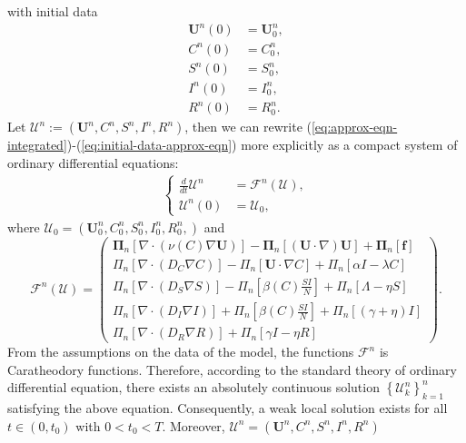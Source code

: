 \documentclass[10pt,number,preprint,times]{elsarticle}
\numberwithin{equation}{section} %
\begin{document}
	with initial data
	\begin{equation}\label{eq:initial-data-approx-eqn}
		\begin{split}
			\boldsymbol{U}^n(0)	&= \boldsymbol{U}_{0}^n,\\
			C^n(0) &= C_{0}^n,\\
			S^n(0) &=S_0^n,\\
			I^n(0) &= I_{0}^n,\\
			R^n(0) &= R_{0}^n.
		\end{split}
	\end{equation}
	Let $\mathcal{U}^n:=(\boldsymbol{U}^n,C^n,S^n,I^n,R^n)$, then we can rewrite (\ref{eq:approx-eqn-integrated})-(\ref{eq:initial-data-approx-eqn}) more explicitly as a compact system of ordinary differential equations:
	\begin{equation}\label{Cauchy-problem}
		\begin{split}
			\begin{cases}
				\frac{d}{dt}\mathcal{U}^n&=\mathcal{F}^n(\mathcal{U}),\\
				\mathcal{U}^n(0)&=\mathcal{U}_0,
			\end{cases}
		\end{split}
	\end{equation}
	where  $\mathcal{U}_0=(\boldsymbol{U}_{0}^n,C_{0}^n,S_{0}^n,I_{0}^n,R_{0}^n,)$ and 
	$$\mathcal{F}^n(\mathcal{U})
	=\begin{pmatrix}
		\boldsymbol{\Pi}_n \left[\nabla \cdot \left(\nu(C) \nabla \boldsymbol{U} \right) \right]-\boldsymbol{\Pi}_n \left[(\boldsymbol{U}\cdot\nabla)\boldsymbol{U} \right]+ 	\boldsymbol{\Pi}_n\left[\boldsymbol{f}\right]
		\\
		\Pi_n \left[\nabla \cdot \left(D_C \nabla C \right) \right]-\Pi_n \left[\boldsymbol{U}\cdot\nabla C \right]+	\Pi_n\left[\alpha I-\lambda C\right]
		\\
		\Pi_n \left[\nabla \cdot \left(D_S \nabla S \right) \right]-\Pi_n \left[ \beta(C)\frac{SI}{N} \right]+	\Pi_n\left[\Lambda -\eta S\right]
		\\
		\Pi_n \left[\nabla \cdot \left(D_I \nabla I \right) \right]+\Pi_n \left[ \beta(C)\frac{SI}{N} \right]+	\Pi_n\left[(\gamma +\eta) I\right]
		\\
		\Pi_n \left[\nabla \cdot \left(D_R \nabla R \right) \right]+	\Pi_n\left[\gamma I-\eta R\right]
	\end{pmatrix}.
	$$
\noindent
	From the assumptions on the data of the model, the functions $\mathcal{F}^n$ is Caratheodory functions. Therefore, according to the standard theory of ordinary differential equation, there exists an absolutely continuous solution $\left\{\mathcal{U}^n_{k}\right\}_{k=1}^{n}$ satisfying the above equation. Consequently, a weak local solution exists for all $t\in (0,t_0)$ with $0<t_0<T$. Moreover, $\mathcal{U}^n=(\boldsymbol{U}^n,C^n,S^n,I^n,R^n)$
\end{document}
